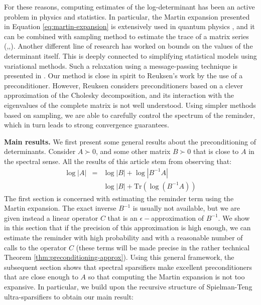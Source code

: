For these reasons, computing estimates of the log-determinant has
been an active problem in physics and statistics. In particular, the
Martin expansion presented in Equation \ref{eq:martin-expansion}
is extensively used in quantum physics \cite{Ipsen2006}, and it can
be combined with sampling method to estimate the trace of a matrix
series (\cite{Zhang2008},\cite{McCourt2008},\cite{Zhang2007}).
Another different line of research has worked on bounds on the values
of the determinant itself. This is deeply connected to simplifying
statistical models using variational methods. Such a relaxation using
a message-passing technique is presented in \cite{Wainwright2006}.
Our method is close in spirit to Reuksen's work \cite{Reusken2002}
by the use of a preconditioner. However, Reuksen considers preconditioners
based on a clever approximation of the Cholesky decomposition, and
its interaction with the eigenvalues of the complete matrix is not
well understood. Using simpler methods based on sampling, we are able
to carefully control the spectrum of the reminder, which in turn leads
to strong convergence guarantees.

\textbf{Main results.} We first present some general results about
the preconditioning of determinants. Consider $A\succ0$, and some
other matrix $B\succ0$ that is close to $A$ in the spectral sense.
All the results of this article stem from observing that:
\begin{eqnarray*}
\log\left|A\right| & = & \log\left|B\right|+\log\left|B^{-1}A\right|\\
 &  & \log\left|B\right|+\text{Tr}\left(\log\left(B^{-1}A\right)\right)
\end{eqnarray*}
The first section is concerned with estimating the reminder term using
the Martin expansion. The exact inverse $B^{-1}$ is usually not available,
but we are given instead a linear operator $C$ that is an $\epsilon-$approximation
of $B^{-1}$. We show in this section that if the precision of this
approximation is high enough, we can estimate the reminder with high
probability and with a reasonable number of calls to the operator
$C$ (these terms will be made precise in the rather technical Theorem
\ref{thm:preconditioning-approx}). Using this general framework,
the subsequent section shows that spectral sparsifiers make excellent
preconditioners that are close enough to $A$ so that computing the
Martin expansion is not too expansive. In particular, we build upon
the recursive structure of Spielman-Teng ultra-sparsifiers to obtain
our main result:

